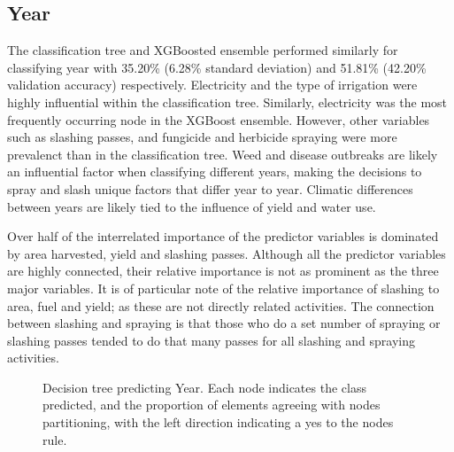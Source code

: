 \documentclass[review,12pt,authoryear]{elsarticle}
\begin{document}
\begin{linenumbers}
\subsection{Year}

The classification tree and XGBoosted ensemble performed similarly for classifying year with 35.20\% (6.28\% standard deviation) and 51.81\% (42.20\% validation accuracy) respectively. Electricity and the type of irrigation were highly influential within the classification tree. Similarly, electricity was the most frequently occurring node in the XGBoost ensemble. However, other variables such as slashing passes, and fungicide and herbicide spraying were more prevalenct than in the classification tree. Weed and disease outbreaks are likely an influential factor when classifying different years, making the decisions to spray and slash unique factors that differ year to year. Climatic differences between years are likely tied to the influence of yield and water use.
\par
Over half of the interrelated importance of the predictor variables is dominated by area harvested, yield and slashing passes. Although all the predictor variables are highly connected, their relative importance is not as prominent as the three major variables. It is of particular note of the relative importance of slashing to area, fuel and yield; as these are not directly related activities. The connection between slashing and spraying is that those who do a set number of spraying or slashing passes tended to do that many passes for all slashing and spraying activities.

\begin{figure}
 \caption{Decision tree predicting Year. Each node indicates the class predicted, and the proportion of elements agreeing with nodes partitioning, with the left direction indicating a yes to the nodes rule.}\label{fig:year_tree}
\end{figure}


\end{linenumbers}
\end{document}
